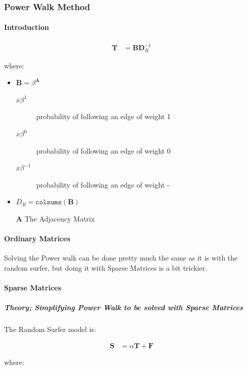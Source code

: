 \documentclass[11pt]{article}
\begin{document}
\subsubsection{Power Walk Method}
\label{sec:org1d5db20}
\paragraph{Introduction}
\label{sec:org1c04ccc}

\begin{align}
\mathbf{T} &= \mathbf{B} \mathbf{D}^{-1}_{B} \label{eq:pwalk-def}
\end{align}



where:

\begin{itemize}
\item \(\mathbf{B}= \beta^{\mathbf{A}}\)
\begin{description}
\item[{\(x\beta^{1}\) }] probability of following an edge of weight 1
\item[{\(x\beta^{0}\) }] probability of following an edge of weight 0
\item[{\(x\beta^{-1}\)}] probability of following an edge of weight -
\end{description}
\item \(D_{B} = \mathtt{colsums}(\mathbf{B})\)
\item[{\(\mathbf{A}\)}] The Adjacency Matrix
\end{itemize}

\paragraph{Ordinary Matrices}
\label{sec:org4d7f15b}
Solving the Power walk can be done pretty much the same as it is with the random surfer, but doing it with Sparse Matrices is a bit trickier.
\paragraph{Sparse Matrices}
\label{sec:orgf16a996}
\subparagraph{Theory; Simplifying Power Walk to be solved with Sparse Matrices}
\label{sec:org7182b99}
The Random Surfer model is:

$$\begin{aligned}
    \mathbf{S} &= \alpha \mathbf{T} +  \mathbf{F}  \label{eq:sparse-RS}\end{aligned}$$

where:
\end{document}
